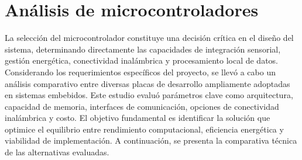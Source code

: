 

\section{Análisis de microcontroladores}    
La selección del microcontrolador constituye una decisión crítica en el diseño del sistema, determinando directamente las capacidades de integración sensorial, gestión energética, conectividad inalámbrica y procesamiento local de datos. Considerando los requerimientos específicos del proyecto, se llevó a cabo un análisis comparativo entre diversas placas de desarrollo ampliamente adoptadas en sistemas embebidos. Este estudio evaluó parámetros clave como arquitectura, capacidad de memoria, interfaces de comunicación, opciones de conectividad inalámbrica y costo. El objetivo fundamental es identificar la solución que optimice el equilibrio entre rendimiento computacional, eficiencia energética y viabilidad de implementación. A continuación, se presenta la comparativa técnica de las alternativas evaluadas.  

 

\begin{table}[H]
\centering
\caption{Comparativa de microcontroladores para nodos fluviales}
\end{table}

